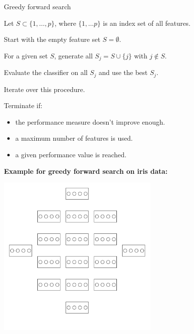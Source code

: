 \documentclass[11pt,compress,t,notes=noshow, xcolor=table]{beamer}
\begin{document}
  \begin{vbframe}{Greedy forward search}

    \begin{blocki}{}
      \item Let $S \subset \{1, \dots, p \}$, where $\{1, \dots p \}$ is an index set of all features.
      \item Start with the empty feature set $S = \emptyset$.
      \item For a given set $S$, generate all $S_j = S \cup \{j\}$ with $j \notin S$.
      \item Evaluate the classifier on all $S_j$ and use the best $S_j$.
      \item Iterate over this procedure.
      \item Terminate if:
        \begin{itemize}
          \item the performance measure doesn't improve enough.
          \item a maximum number of features is used.
          \item a given performance value is reached.
        \end{itemize}
    \end{blocki}

    \framebreak

    \textbf{Example for greedy forward search on iris data:}
    \begin{center}
    \includegraphics[width = 0.6\textwidth]{figure_man/wrapperanim1.png}
    \end{center}

    \framebreak


\end{vbframe}
\end{document}
